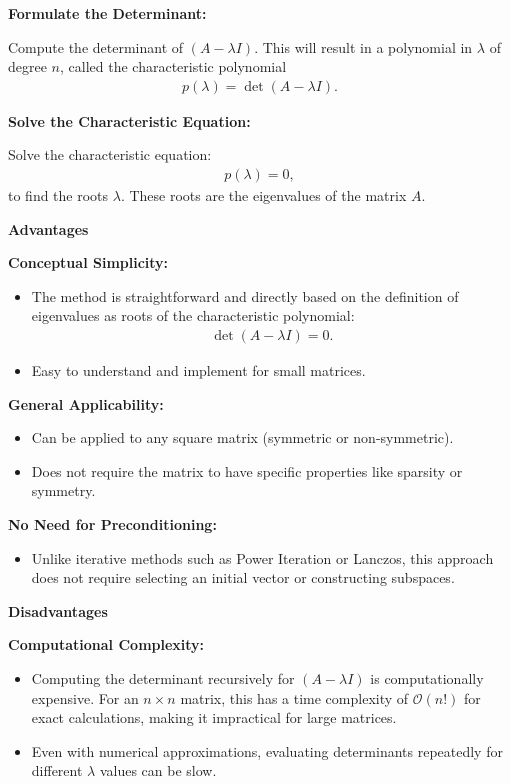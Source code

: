 \documentclass[journal]{IEEEtran}
\begin{document}
\begin{enumerate}
\textbf{Formulate the Determinant:}

Compute the determinant of $(A - \lambda I)$. This will result in a polynomial in $\lambda$ of degree $n$, called the characteristic polynomial
\begin{align}
p(\lambda) = \det(A - \lambda I).
\end{align}

\textbf{Solve the Characteristic Equation:}

Solve the characteristic equation:
\begin{align}
p(\lambda) = 0,
\end{align}
to find the roots $\lambda$. These roots are the eigenvalues of the matrix $A$.

\textbf{Advantages}

\textbf{Conceptual Simplicity:}
\begin{itemize}
    \item The method is straightforward and directly based on the definition of eigenvalues as roots of the characteristic polynomial:
    \begin{align}
    \det(A - \lambda I) = 0.
    \end{align}
    \item Easy to understand and implement for small matrices.
\end{itemize}

\textbf{General Applicability:}
\begin{itemize}
    \item Can be applied to any square matrix (symmetric or non-symmetric).
    \item Does not require the matrix to have specific properties like sparsity or symmetry.
\end{itemize}

\textbf{No Need for Preconditioning:}
\begin{itemize}
    \item Unlike iterative methods such as Power Iteration or Lanczos, this approach does not require selecting an initial vector or constructing subspaces.
\end{itemize}

\textbf{Disadvantages}

\textbf{Computational Complexity:}
\begin{itemize}
    \item Computing the determinant recursively for $(A - \lambda I)$ is computationally expensive. For an $n \times n$ matrix, this has a time complexity of $\mathcal{O}(n!)$ for exact calculations, making it impractical for large matrices.
    \item Even with numerical approximations, evaluating determinants repeatedly for different $\lambda$ values can be slow.
\end{itemize}


\end{enumerate}
\end{document}
